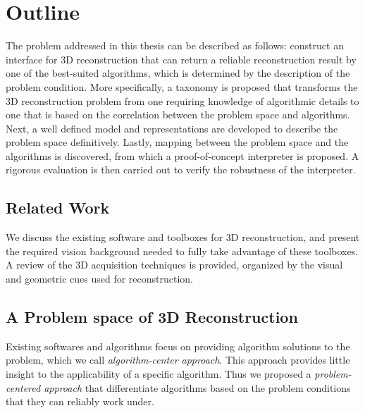 
\section{Outline}
The problem addressed in this thesis can be described as follows: construct an interface for 3D reconstruction that can return a reliable reconstruction result by one of the best-suited algorithms, which is determined by the description of the problem condition. More specifically, a taxonomy is proposed that transforms the 3D reconstruction problem from one requiring knowledge of algorithmic details to one that is based on the correlation between the problem space and algorithms. Next, a well defined model and representations are developed to describe the problem space definitively. Lastly, mapping between the problem space and the algorithms is discovered, from which a proof-of-concept interpreter is proposed. A rigorous evaluation is then carried out to verify the robustness of the interpreter. 

\subsection{Related Work}
We discuss the existing software and toolboxes for 3D reconstruction, and present the required vision background needed to fully take advantage of these toolboxes. A review of the 3D acquisition techniques is provided, organized by the visual and geometric cues used for reconstruction.

\subsection{A Problem space of 3D Reconstruction}
Existing softwares and algorithms focus on providing algorithm solutions to the problem, which we call \textit{algorithm-center approach}. This approach provides little insight to the applicability of a specific algorithm. Thus we proposed a \textit{problem-centered approach} that differentiate algorithms based on the problem conditions that they can reliably work under.

